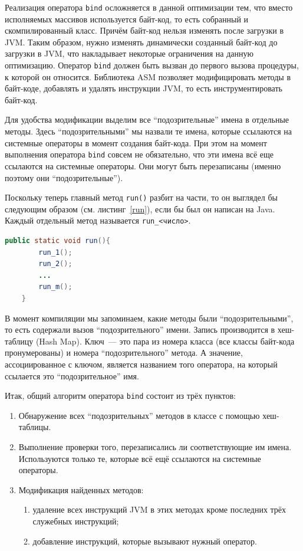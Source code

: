 	Реализация оператора \texttt{bind} осложняется в данной оптимизации тем, что вместо исполняемых массивов используется байт-код, то есть собранный и скомпилированный класс. Причём байт-код нельзя изменять после загрузки в JVM.  Таким образом,  нужно изменять динамически созданный байт-код до загрузки в JVM, что накладывает некоторые ограничения на данную оптимизацию. Оператор \texttt{bind} должен быть вызван до первого вызова процедуры, к которой он относится. Библиотека ASM позволяет модифицировать методы в байт-коде, добавлять и удалять инструкции JVM, то есть инструментировать байт-код. 
	
	Для удобства модификации выделим все ``подозрительные'' имена в отдельные методы. Здесь ``подозрительными'' мы назвали те имена, которые ссылаются на системные операторы в момент создания байт-кода. При этом на момент выполнения оператора \texttt{bind} совсем не обязательно, что эти имена всё еще ссылаются на системные операторы. Они могут быть перезаписаны (именно поэтому они ``подозрительные'').
	
	Поскольку теперь главный метод \texttt{run()} разбит на части, то он выглядел бы следующим образом (см. листинг~\ref{run}), если  бы был он написан на Java. Каждый отдельный метод называется \texttt{run\_<число>}.
	\begin{lstlisting}[label=run,caption=Структура метода run(),captionpos=b,language = Java]
	public static void run(){
		run_1();	
		run_2();
		...
		run_m();		
	}
	\end{lstlisting}
	
	В момент компиляции мы запоминаем, какие методы были ``подозрительными'', то есть содержали вызов ``подозрительного''  имени. Запись производится в хеш-таблицу (Hash Map). Ключ~--- это пара из номера класса (все классы байт-кода пронумерованы) и номера ``подозрительного'' метода. А значение, ассоциированное с ключом, является названием того оператора, на который ссылается это ``подозрительное'' имя.
	
	Итак, общий алгоритм оператора \texttt{bind} состоит из трёх пунктов:
	\begin{enumerate}
		\item Обнаружение всех ``подозрительных'' методов в классе с помощью хеш-таблицы.
		\item Выполнение проверки того, перезаписались ли соответствующие им имена. Используются только те, которые всё ещё ссылаются на системные операторы.
		\item Модификация найденных методов:
				\begin{enumerate}
					\item удаление всех инструкций JVM в этих методах кроме последних трёх служебных инструкций;
					\item добавление инструкций, которые вызывают нужный оператор.
				\end{enumerate}				
	\end{enumerate}
	

